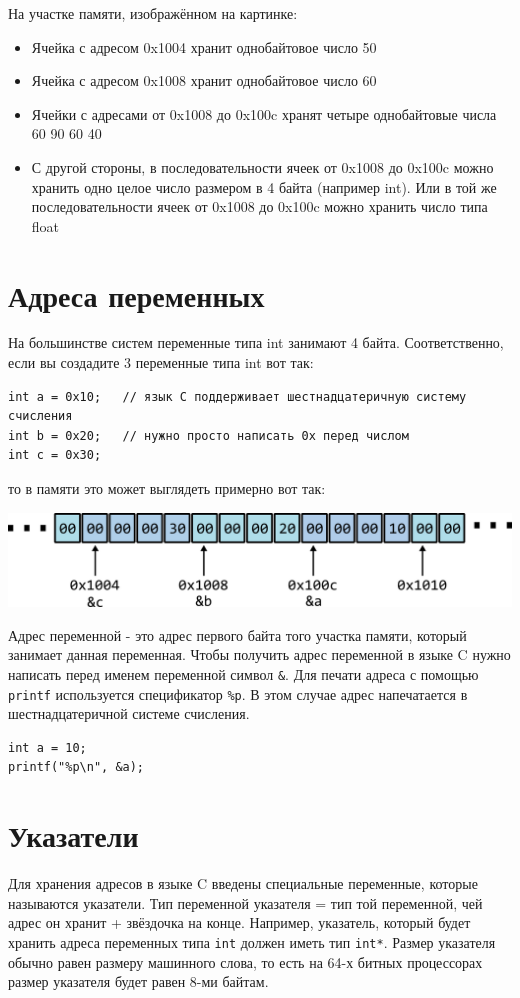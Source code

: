 \documentclass{article}
\begin{document}
 
На участке памяти, изображённом на картинке:

\begin{itemize}
\item Ячейка с адресом 0x1004 хранит однобайтовое число 50
\item Ячейка с адресом 0x1008 хранит однобайтовое число 60
\item Ячейки с адресами от 0x1008 до 0x100c хранят четыре однобайтовые числа  60 90 60 40
\item С другой стороны, в последовательности ячеек от 0x1008 до 0x100c можно хранить одно целое число размером в 4 байта (например int). Или в той же последовательности ячеек от 0x1008 до 0x100c можно хранить число типа float
\end{itemize}

\section*{Адреса переменных}
На большинстве систем переменные типа int занимают 4 байта. Соответственно, если вы создадите 3 переменные типа int вот так:
\begin{lstlisting}
int a = 0x10;   // язык C поддерживает шестнадцатеричную систему счисления
int b = 0x20;   // нужно просто написать 0x перед числом
int c = 0x30;
\end{lstlisting}
то в памяти это может выглядеть примерно вот так:
\begin{center}
\includegraphics[scale=1]{../images/memory2.png}
\end{center}

Адрес переменной - это адрес первого байта того участка памяти, который занимает данная переменная.
Чтобы получить адрес переменной в языке C нужно написать перед именем переменной символ \texttt{\&}.
Для печати адреса с помощью \texttt{printf} используется спецификатор \texttt{\%p}. 
В этом случае адрес напечатается в шестнадцатеричной системе счисления.
\begin{lstlisting}
int a = 10;
printf("%p\n", &a);
\end{lstlisting}


\section*{Указатели}
Для хранения адресов в языке C введены специальные переменные, которые называются указатели. Тип переменной указателя = тип той переменной, чей адрес он хранит + звёздочка на конце. Например, указатель, который будет хранить адреса переменных типа \texttt{int} должен иметь тип \texttt{int*}. Размер указателя обычно равен размеру машинного слова, то есть на 64-х битных процессорах размер указателя будет равен 8-ми байтам.
\end{document}
